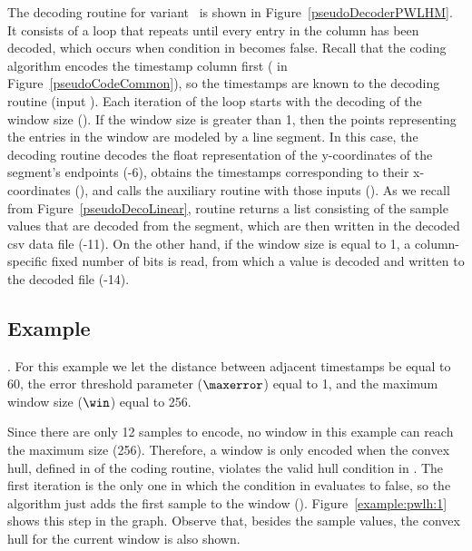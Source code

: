 


\clearpage


The decoding routine for variant \maskalgo\ is shown in Figure~\ref{pseudoDecoderPWLHM}. It consists of a loop that repeats until every entry in the column has been decoded, which occurs when condition in  becomes false. Recall that the coding algorithm encodes the timestamp column first ( in Figure~\ref{pseudoCodeCommon}), so the timestamps are known to the decoding routine (input \tscol). Each iteration of the loop starts with the decoding of the window size (). If the window size is greater than 1, then the points representing the entries in the window are modeled by a line segment. In this case, the decoding routine decodes the float representation of the y-coordinates of the segment's endpoints (-6), obtains the timestamps corresponding to their x-coordinates (), and calls the auxiliary routine \decodeSegment with those inputs (). As we recall from Figure~\ref{pseudoDecoLinear}, routine \decodeSegment returns a list consisting of the sample values that are decoded from the segment, which are then written in the decoded csv data file (-11). On the other hand, if the window size is equal to 1, a column-specific fixed number of bits is read, from which a value is decoded and written to the decoded file (-14).







\clearpage


\subsection{Example}
\label{algo:pwlh:example}
\newcommand{\exampleIntro}[1]{\exampleIntroFirst{#1}. For this example we let the distance between adjacent timestamps be equal to 60, the error threshold parameter ($\maxerror$) equal to 1, and the maximum window size ($\win$) equal to 256.}


\exampleIntro{\ref{example:pwlh:1}}


Since there are only 12 samples to encode, no window in this example can reach the maximum size (256). Therefore, a window is only encoded when the convex hull, defined in  of the coding routine, violates the valid hull condition in . The first iteration is the only one in which the condition in  evaluates to false, so the algorithm just adds the first sample to the window (). Figure~\ref{example:pwlh:1} shows this step in the graph. Observe that, besides the sample values, the convex hull for the current window is also shown.


